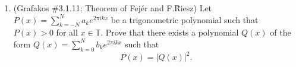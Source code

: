 \documentclass[a4paper]{article}
\begin{document}
\begin{enumerate}
\begin{proof}
\begin{enumerate}
    \item
    We start with the Dirichlet kernel. For $D_N(x)$, we easily see that
    \[
      \hat{D}_N (k) =
      \begin{cases}
        1 &\text{if } k \leq N \\
        0 &\text{else}
      \end{cases}
    \]

    By linearity, we find the Fourier coefficients of $F_N$ are given by
    \begin{align*}
      \hat{F}_N (k) &= \frac{1}{N+1} \sum_{n=0}^N \hat{D}_n (k) \\
      &= \begin{cases}
        1 - \frac{k+1}{N+1} &\text{if } k \leq N \\
        0 &\text{else}
        \end{cases}
    \end{align*}

    Then
    \begin{align*}
      \hat{V}_N(k) &= 2 \hat{F}_{2N+1}(k) - \hat{F}_N (k) \\
      &= \begin{cases}
        \left( 2 - \frac{2(k+1)}{2(N+1)} \right) - \left( 1 - \frac{k+1}{N+1} \right) &\text{if } k \leq N \\
        2 - \frac{2(k+1)}{2(N+1)} &\text{if } N < k \leq < 2N+1 \\
        0 &\text{else}
      \end{cases} \\
      &= \begin{cases}
        1 &\text{if } k \leq N \\
        2 - \frac{k+1}{N+1} &\text{if } N < k \leq 2N+1 \\
        0 &\text{else}
      \end{cases}
    \end{align*}

  \end{enumerate}

  \end{proof}

\item  (Grafakos \#3.1.11; Theorem of Fej\'er and F.\~Riesz)  Let $\displaystyle{ P(x) = \sum_{k=-N}^N a_k e^{2\pi i k x} }$ be a trigonometric polynomial such that $ P(x) > 0$ for all $x\in \mathbb T$. Prove that there exists a polynomial  $Q(x)$ of the form  $\displaystyle{ Q(x) = \sum_{k=0}^N b_k e^{2\pi i k x} }$ such that $$P (x) = | Q(x) |^2 . $$


\end{enumerate}
\end{document}
